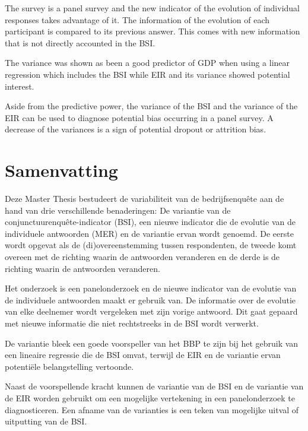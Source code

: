 \documentclass[12pt,a4paper,oneside]{book}
\begin{document}
The survey is a panel survey and the new indicator of the evolution of individual responses takes advantage of it. The information of the evolution of each participant is compared to its previous answer.
This comes with new information that is not directly accounted in the BSI.
 

The variance was shown as been a good predictor of GDP when using a linear regression which includes the BSI while EIR and its variance showed potential interest.


Aside from the predictive power, the variance of the BSI and the variance of the EIR can be used to diagnose potential bias occurring in a panel survey. A decrease of the variances is a sign of potential dropout or attrition bias.

\newpage
\section*{Samenvatting}

Deze Master Thesis bestudeert de variabiliteit van de bedrijfsenquête aan de hand van drie verschillende benaderingen: 
De variantie van de conjunctuurenquête-indicator (BSI), een nieuwe indicator die de evolutie van de individuele antwoorden (MER) en de variantie ervan wordt genoemd.
De eerste wordt opgevat als de (di)overeenstemming tussen respondenten, de tweede komt overeen met de richting waarin de antwoorden veranderen en de derde is de richting waarin de antwoorden veranderen.

Het onderzoek is een panelonderzoek en de nieuwe indicator van de evolutie van de individuele antwoorden maakt er gebruik van. De informatie over de evolutie van elke deelnemer wordt vergeleken met zijn vorige antwoord.
Dit gaat gepaard met nieuwe informatie die niet rechtstreeks in de BSI wordt verwerkt.

De variantie bleek een goede voorspeller van het BBP te zijn bij het gebruik van een lineaire regressie die de BSI omvat, terwijl de EIR en de variantie ervan potentiële belangstelling vertoonde.

Naast de voorspellende kracht kunnen de variantie van de BSI en de variantie van de EIR worden gebruikt om een mogelijke vertekening in een panelonderzoek te diagnosticeren. Een afname van de varianties is een teken van mogelijke uitval of uitputting van de BSI.
\end{document}
